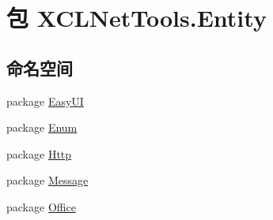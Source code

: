 \hypertarget{namespace_x_c_l_net_tools_1_1_entity}{\section{包 X\-C\-L\-Net\-Tools.\-Entity}
\label{namespace_x_c_l_net_tools_1_1_entity}
}
\subsection*{命名空间}
\begin{DoxyCompactItemize}
\item 
package \hyperlink{namespace_x_c_l_net_tools_1_1_entity_1_1_easy_u_i}{Easy\-U\-I}
\item 
package \hyperlink{namespace_x_c_l_net_tools_1_1_entity_1_1_enum}{Enum}
\item 
package \hyperlink{namespace_x_c_l_net_tools_1_1_entity_1_1_http}{Http}
\item 
package \hyperlink{namespace_x_c_l_net_tools_1_1_entity_1_1_message}{Message}
\item 
package \hyperlink{namespace_x_c_l_net_tools_1_1_entity_1_1_office}{Office}
\end{DoxyCompactItemize}
